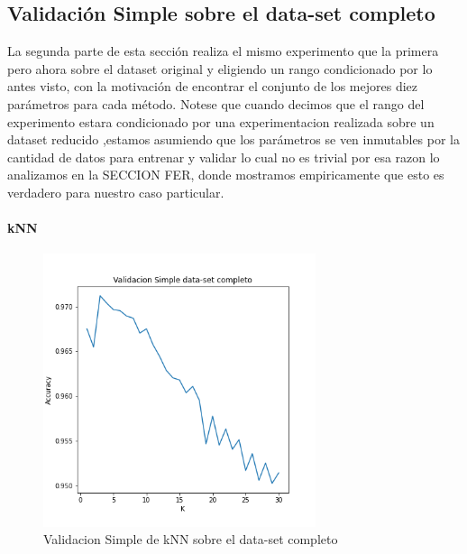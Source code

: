 \subsection{Validación Simple sobre el data-set completo}

La segunda parte de esta sección realiza el mismo experimento que la primera pero ahora sobre el dataset original y eligiendo un rango condicionado por lo antes visto, con la motivación de encontrar el conjunto de los mejores diez parámetros para cada método. Notese que cuando decimos que el rango del experimento estara condicionado por una experimentacion realizada sobre un dataset reducido ,estamos asumiendo que los parámetros se ven inmutables por la cantidad de datos para entrenar y validar lo cual no es trivial por esa razon lo analizamos en la SECCION FER, donde mostramos empiricamente que esto es verdadero para nuestro caso particular.


\paragraph{kNN}


\begin{figure}[H]
    \centering
    \includegraphics[width=8cm]{images/validacionSimple_datasetCompleto.png}%
    \qquad
    \caption{Validacion Simple de kNN sobre el data-set completo}
    \label{knn_valSimple}%
\end{figure}

